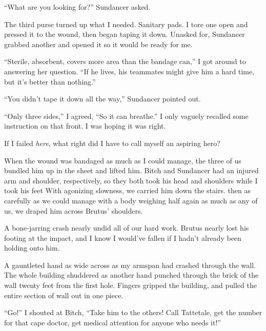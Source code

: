``What are you looking for?'' Sundancer asked.



The third purse turned up what I needed.  Sanitary pads.  I tore one open and pressed it to the wound, then began taping it down.  Unasked for, Sundancer grabbed another and opened it so it would be ready for me.



``Sterile, absorbent, covers more area than the bandage can,'' I got around to answering her question.  ``If he lives, his teammates might give him a hard time, but it's better than nothing.''



``You didn't tape it down all the way,'' Sundancer pointed out.



``Only three sides,'' I agreed, ``So it can breathe.''  I only vaguely recalled some instruction on that front.  I was hoping it was right.



If I failed \emph{here}, what right did I have to call myself an aspiring hero?



When the wound was bandaged as much as I could manage, the three of us bundled him up in the sheet and lifted him.  Bitch and Sundancer had an injured arm and shoulder, respectively, so they both took his head and shoulders while I took his feet  With agonizing slowness, we carried him down the stairs.  then as carefully as we could manage with a body weighing half again as much as any of us, we draped him across Brutus' shoulders.



A bone-jarring crash nearly undid all of our hard work.  Brutus nearly lost his footing at the impact, and I know I would've fallen if I hadn't already been holding onto him.



A gauntleted hand as wide across as my armspan had crashed through the wall.  The whole building shuddered as another hand punched through the brick of the wall twenty feet from the first hole.  Fingers gripped the building, and pulled the entire section of wall out in one piece.



``Go!'' I shouted at Bitch, ``Take him to the others!  Call Tattetale, get the number for that cape doctor, get medical attention for anyone who needs it!''



